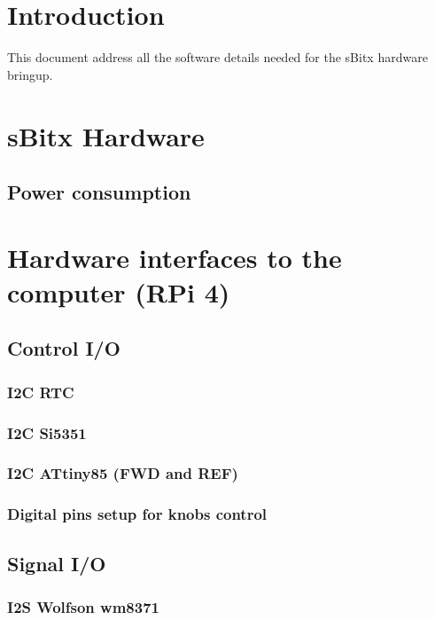 
\section{Introduction}

This document address all the software details needed for the sBitx hardware bringup.



\section{sBitx Hardware}


\subsection{Power consumption}


\section{Hardware interfaces to the computer (RPi 4)}


\subsection {Control I/O}

\subsubsection{I2C RTC}

\subsubsection{I2C Si5351}

\subsubsection{I2C ATtiny85 (FWD and REF)}

\subsubsection{Digital pins setup for knobs control}

\subsection{Signal I/O}

\subsubsection{I2S Wolfson wm8371}

